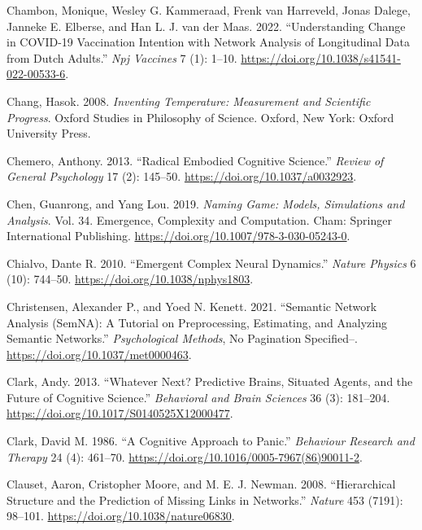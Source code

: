 \documentclass[
  a4paper,
  DIV=11,
  numbers=noendperiod,
  oneside]{scrreprt}
\newlength{\cslhangindent}
\newenvironment{CSLReferences}[2] %
 {\begin{list}{}{%
  \setlength{\itemindent}{0pt}
  \setlength{\leftmargin}{0pt}
  \setlength{\parsep}{0pt}
  \ifodd #1
   \setlength{\leftmargin}{\cslhangindent}
   \setlength{\itemindent}{-1\cslhangindent}
  \fi
  \setlength{\itemsep}{#2\baselineskip}}}
 {\end{list}}
\begin{document}
\begin{CSLReferences}{1}{0}
Chambon, Monique, Wesley G. Kammeraad, Frenk van Harreveld, Jonas
Dalege, Janneke E. Elberse, and Han L. J. van der Maas. 2022.
{``Understanding Change in {COVID-19} Vaccination Intention with Network
Analysis of Longitudinal Data from {Dutch} Adults.''} \emph{Npj
Vaccines} 7 (1): 1--10.
\url{https://doi.org/10.1038/s41541-022-00533-6}.

Chang, Hasok. 2008. \emph{Inventing {Temperature}: {Measurement} and
{Scientific Progress}}. Oxford {Studies} in {Philosophy} of {Science}.
{Oxford, New York}: {Oxford University Press}.

Chemero, Anthony. 2013. {``Radical {Embodied Cognitive Science}.''}
\emph{Review of General Psychology} 17 (2): 145--50.
\url{https://doi.org/10.1037/a0032923}.

Chen, Guanrong, and Yang Lou. 2019. \emph{Naming {Game}: {Models},
{Simulations} and {Analysis}}. Vol. 34. Emergence, {Complexity} and
{Computation}. {Cham}: {Springer International Publishing}.
\url{https://doi.org/10.1007/978-3-030-05243-0}.

Chialvo, Dante R. 2010. {``Emergent Complex Neural Dynamics.''}
\emph{Nature Physics} 6 (10): 744--50.
\url{https://doi.org/10.1038/nphys1803}.

Christensen, Alexander P., and Yoed N. Kenett. 2021. {``Semantic Network
Analysis ({SemNA}): {A} Tutorial on Preprocessing, Estimating, and
Analyzing Semantic Networks.''} \emph{Psychological Methods}, No
Pagination Specified--. \url{https://doi.org/10.1037/met0000463}.

Clark, Andy. 2013. {``Whatever Next? {Predictive} Brains, Situated
Agents, and the Future of Cognitive Science.''} \emph{Behavioral and
Brain Sciences} 36 (3): 181--204.
\url{https://doi.org/10.1017/S0140525X12000477}.

Clark, David M. 1986. {``A Cognitive Approach to Panic.''}
\emph{Behaviour Research and Therapy} 24 (4): 461--70.
\url{https://doi.org/10.1016/0005-7967(86)90011-2}.

Clauset, Aaron, Cristopher Moore, and M. E. J. Newman. 2008.
{``Hierarchical Structure and the Prediction of Missing Links in
Networks.''} \emph{Nature} 453 (7191): 98--101.
\url{https://doi.org/10.1038/nature06830}.


\end{CSLReferences}
\end{document}
